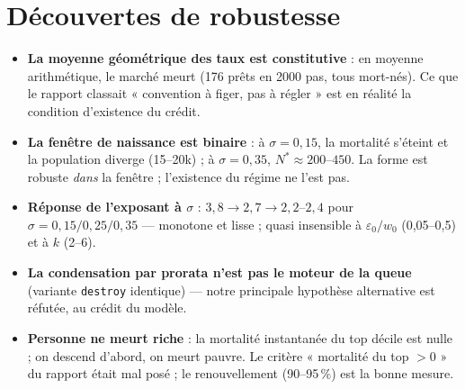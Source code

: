 \documentclass[10pt,a4paper]{article}
\newcommand{\code}[1]{\texttt{#1}}
\begin{document}
\section{Découvertes de robustesse}
\begin{itemize}[leftmargin=1.4em, itemsep=3pt]
\item \textbf{La moyenne géométrique des taux est constitutive} : en moyenne
  arithmétique, le marché meurt (176 prêts en 2000 pas, tous mort-nés). Ce
  que le rapport classait « convention à figer, pas à régler » est en
  réalité la condition d'existence du crédit.
\item \textbf{La fenêtre de naissance est binaire} : à $\sigma = 0{,}15$, la
  mortalité s'éteint et la population diverge (15--20k) ; à
  $\sigma = 0{,}35$, $N^* \approx 200$--$450$. La forme est robuste
  \emph{dans} la fenêtre ; l'existence du régime ne l'est pas.
\item \textbf{Réponse de l'exposant à $\sigma$} : $3{,}8 \to 2{,}7 \to
  2{,}2$--$2{,}4$ pour $\sigma = 0{,}15/0{,}25/0{,}35$ — monotone et lisse ;
  quasi insensible à $\varepsilon_0/w_0$ (0,05--0,5) et à $k$ (2--6).
\item \textbf{La condensation par prorata n'est pas le moteur de la queue}
  (variante \code{destroy} identique) — notre principale hypothèse
  alternative est réfutée, au crédit du modèle.
\item \textbf{Personne ne meurt riche} : la mortalité instantanée du top
  décile est nulle ; on descend d'abord, on meurt pauvre. Le critère
  « mortalité du top $> 0$ » du rapport était mal posé ; le renouvellement
  (90--95\,\%) est la bonne mesure.
\end{itemize}
\end{document}
